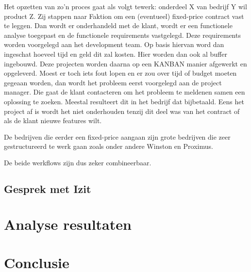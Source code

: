 \documentclass{hogent-article}
\begin{document}
    Het opzetten van zo'n proces gaat als volgt tewerk: onderdeel X van bedrijf Y wil product Z. Zij stappen naar Faktion om een (eventueel) fixed-price contract vast te leggen. Dan wordt er onderhandeld met de klant, wordt er een functionele analyse toegepast en de functionele requirements vastgelegd. Deze requirements worden voorgelegd aan het development team. Op basis hiervan word dan ingeschat hoeveel tijd en geld dit zal kosten. Hier worden dan ook al buffer ingebouwd. Deze projecten worden daarna op een KANBAN manier afgewerkt en opgeleverd. Moest er toch iets fout lopen en er zou over tijd of budget moeten gegeaan worden, dan wordt het probleem eerst voorgelegd aan de project manager. Die gaat de klant contacteren om het probleem te meldenen samen een oplossing te zoeken. Meestal resulteert dit in het bedrijf dat bijbetaald. Eens het project af is wordt het niet onderhouden tenzij dit deel was van het contract of als de klant nieuwe features wilt.
    
    De bedrijven die eerder een fixed-price aangaan zijn grote bedrijven die zeer gestructureerd te werk gaan zoals onder andere Winston en Proximus.
    
    De beide werkflows zijn dus zeker combineerbaar.
    
    \subsection{Gesprek met Izit}
	\section{Analyse resultaten}
	

	
	\section{Conclusie}
	

	
	
	\printbibliography[heading=bibintoc]
	
\end{document}
